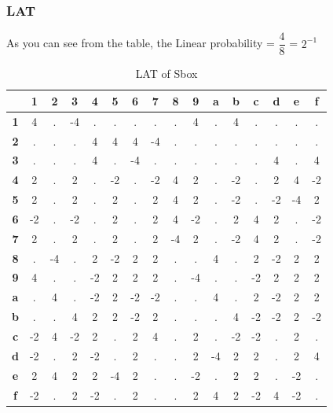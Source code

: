 \documentclass[preprint]{transcrypto}
\begin{document}
\subsubsection{LAT}
As you can see from the table, the Linear probability = $\dfrac{4}{8}$ = $2^{-1}$
\\
\begin{table}[!h]
\centering
\begin{tabular}{|c|c|c|c|c|c|c|c|c|c|c|c|c|c|c|c|}
\hline
 &
  \textbf{1} &
  \textbf{2} &
  \textbf{3} &
  \textbf{4} &
  \textbf{5} &
  \textbf{6} &
  \textbf{7} &
  \textbf{8} &
  \textbf{9} &
  \textbf{a} &
  \textbf{b} &
  \textbf{c} &
  \textbf{d} &
  \textbf{e} &
  \textbf{f} \\ \hline
\textbf{1}&4&.&-4&.&.&.&.&.&4&.&4&.&.&.&.\\\hline
\textbf{2}&.&.&.&4&4&4&-4&.&.&.&.&.&.&.&.\\\hline
\textbf{3}&.&.&.&4&.&-4&.&.&.&.&.&.&4&.&4\\\hline
\textbf{4}&2&.&2&.&-2&.&-2&4&2&.&-2&.&2&4&-2\\\hline
\textbf{5}&2&.&2&.&2&.&2&4&2&.&-2&.&-2&-4&2\\\hline
\textbf{6}&-2&.&-2&.&2&.&2&4&-2&.&2&4&2&.&-2\\\hline
\textbf{7}&2&.&2&.&2&.&2&-4&2&.&-2&4&2&.&-2\\\hline
\textbf{8}&.&-4&.&2&-2&2&2&.&.&4&.&2&-2&2&2\\\hline
\textbf{9}&4&.&.&-2&2&2&2&.&-4&.&.&-2&2&2&2\\\hline
\textbf{a}&.&4&.&-2&2&-2&-2&.&.&4&.&2&-2&2&2\\\hline
\textbf{b}&.&.&4&2&2&-2&2&.&.&.&4&-2&-2&2&-2\\\hline
\textbf{c}&-2&4&-2&2&.&2&4&.&2&.&-2&-2&.&2&.\\\hline
\textbf{d}&-2&.&2&-2&.&2&.&.&2&-4&2&2&.&2&4\\\hline
\textbf{e}&2&4&2&2&-4&2&.&.&-2&.&2&2&.&-2&.\\\hline
\textbf{f}&-2&.&2&-2&.&2&.&.&2&4&2&-2&4&-2&.\\\hline
\end{tabular}
\caption{LAT of Sbox}
\end{table}
\end{document}
